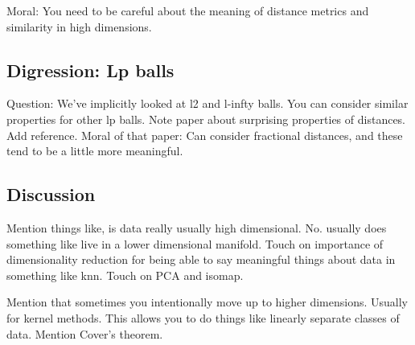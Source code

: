 \documentclass{book}
\begin{document}
Moral: You need to be careful about the meaning of distance metrics and similarity in high dimensions. 

\subsection{Digression: Lp balls}
Question: We've implicitly looked at l2 and l-infty balls. You can consider similar properties for other lp balls. Note paper about surprising properties of distances. Add reference. Moral of that paper: Can consider fractional distances, and these tend to be a little more meaningful. 

\subsection{Discussion}
Mention things like, is data really usually high dimensional. No. usually does something like live in a lower dimensional manifold. Touch on importance of dimensionality reduction for being able to say meaningful things about data in something like knn. Touch on PCA and isomap. 

Mention that sometimes you intentionally move up to higher dimensions. Usually for kernel methods. This allows you to do things like linearly separate classes of data. Mention Cover's theorem. 
\end{document}
